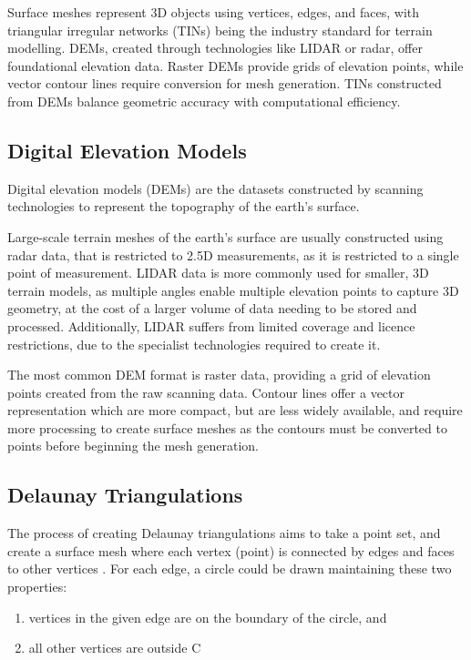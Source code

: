 \documentclass[12pt]{article}
\begin{document}
Surface meshes represent 3D objects using vertices, edges, and faces, with triangular irregular networks (TINs) being the industry standard for terrain modelling. DEMs, created through technologies like LIDAR or radar, offer foundational elevation data. Raster DEMs provide grids of elevation points, while vector contour lines require conversion for mesh generation. TINs constructed from DEMs balance geometric accuracy with computational efficiency.

\subsection{Digital Elevation Models}

Digital elevation models (DEMs) are the datasets constructed by scanning technologies to represent the topography of the earth's surface.

Large-scale terrain meshes of the earth's surface are usually constructed using radar data, that is restricted to 2.5D measurements, as it is restricted to a single point of measurement. LIDAR data is more commonly used for smaller, 3D terrain models, as multiple angles enable multiple elevation points to capture 3D geometry, at the cost of a larger volume of data needing to be stored and processed. Additionally, LIDAR suffers from limited coverage and licence restrictions, due to the specialist technologies required to create it.

The most common DEM format is raster data, providing a grid of elevation points created from the raw scanning data. Contour lines offer a vector representation which are more compact, but are less widely available, and require more processing to create surface meshes as the contours must be converted to points before beginning the mesh generation.

\subsection{Delaunay Triangulations}\label{section:cs:dt}

The process of creating Delaunay triangulations aims to take a point set, and create a surface mesh where each vertex (point) is connected by edges and faces to other vertices \autocite{preparata2012computational}. For each edge, a circle could be drawn maintaining these two properties:

\begin{enumerate}[(1)]
  \item vertices in the given edge are on the boundary of the circle, and
  \item all other vertices are outside C
\end{enumerate}
\end{document}
